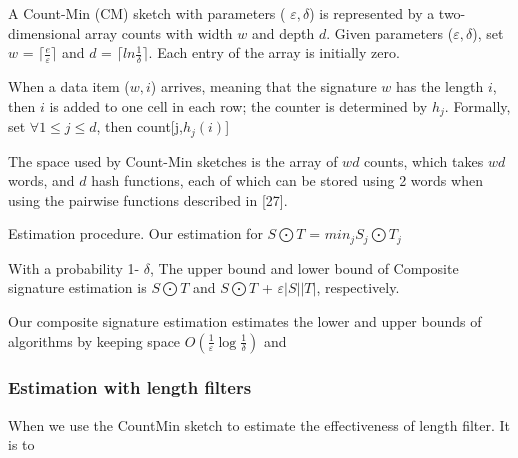A Count-Min (CM) sketch with parameters ( $\varepsilon, \delta$) is represented by a two-dimensional
array counts with width $w$ and depth $d$. Given parameters ($\varepsilon, \delta$), set
$w$ = $\lceil \frac{e}{\varepsilon} \rceil$ and $d$ = $\lceil ln \frac{1}{\delta} \rceil $. Each entry of the array is initially zero.


When a data item ($w,i$) arrives, meaning that the signature $w$ has the length $i$, then $i$ is added to one cell in each row; the counter is determined by $h_j$. Formally, set $\forall 1 \leq j \leq d$, then count[j,$h_j(i)$]


The space used by Count-Min sketches is the array of $wd$ counts, which takes $wd$ words, and $d$ hash
functions, each of which can be stored using 2 words when using the pairwise functions described in [27].

Estimation procedure. Our estimation for $S \bigodot T $ = $min_j S_j \bigodot T_j $


\begin{theorem}
With a probability 1- $\delta$, The upper bound and lower bound of Composite signature estimation is
 $S \bigodot T $ and  $S \bigodot T $ + $\varepsilon |S| |T|$, respectively.
\end{theorem}

\begin{theorem}
Our composite signature estimation estimates the lower and upper bounds of algorithms by keeping space $O(\frac{1}{\varepsilon} \log \frac{1}{\delta})$ and
\end{theorem}

\subsubsection{Estimation with length filters}

When we use the CountMin sketch to estimate the effectiveness of length filter. It is to

%
%
%
%
%
%
%
%
%




